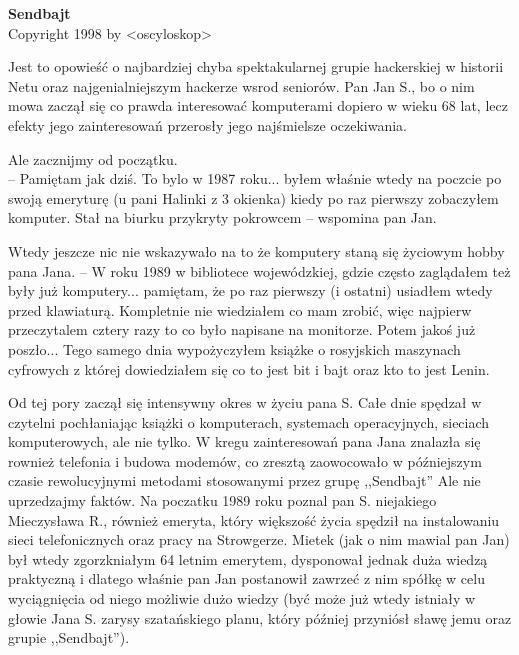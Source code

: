 \documentclass[a4paper,polish,titlepage,12pt]{article}
\begin{document}
\begin{titlepage}
\begin{center}
{\Huge\bf Sendbajt}\\
\vspace{2cm}
{\small Copyright 1998 by <oscyloskop>}
\end{center}
\end{titlepage}

Jest to opowieść o najbardziej chyba spektakularnej grupie hackerskiej w historii Netu oraz najgenialniejszym hackerze wsrod seniorów. Pan Jan S., bo o nim mowa zaczął się co prawda interesować komputerami dopiero w wieku 68 lat, lecz efekty jego zainteresowań przerosły jego najśmielsze oczekiwania.

Ale zacznijmy od początku.\\
-- Pamiętam jak dziś. To bylo w 1987 roku... byłem właśnie wtedy na poczcie po swoją emeryturę (u pani Halinki z 3 okienka) kiedy po raz pierwszy zobaczyłem komputer. Stał na biurku przykryty pokrowcem -- wspomina pan Jan.

Wtedy jeszcze nic nie wskazywało na to że komputery staną się życiowym hobby pana Jana.
-- W roku 1989 w bibliotece wojewódzkiej, gdzie często zaglądałem też były już komputery... pamiętam, że po raz pierwszy (i ostatni) usiadłem wtedy przed klawiaturą. Kompletnie nie wiedziałem co mam zrobić, więc najpierw przeczytalem cztery razy to co było napisane na monitorze. Potem jakoś już poszło... Tego samego dnia wypożyczyłem książke o rosyjskich maszynach cyfrowych z której dowiedziałem się co to jest bit i bajt oraz kto to jest Lenin.

Od tej pory zaczął się intensywny okres w życiu pana S. Całe dnie spędzał w czytelni pochłaniając książki o komputerach, systemach operacyjnych, sieciach komputerowych, ale nie tylko.
W kregu zainteresowań pana Jana znalazła się rownież telefonia i budowa modemów, co zresztą zaowocowało w późniejszym czasie rewolucyjnymi metodami stosowanymi przez grupę
,,Sendbajt'' Ale nie uprzedzajmy faktów. Na poczatku 1989 roku poznal pan S. niejakiego Mieczysława R., również emeryta, który większość życia spędził na instalowaniu sieci
telefonicznych oraz pracy na Strowgerze. Mietek (jak o nim mawial pan Jan) był wtedy zgorzkniałym 64 letnim emerytem, dysponował jednak duża wiedzą praktyczną i dlatego
właśnie pan Jan postanowił zawrzeć z nim spółkę w celu wyciągnięcia od niego możliwie dużo wiedzy (być może już wtedy istniały w głowie Jana S. zarysy szatańskiego planu,
który później przyniósł sławę jemu oraz grupie ,,Sendbajt'').
\end{document}
